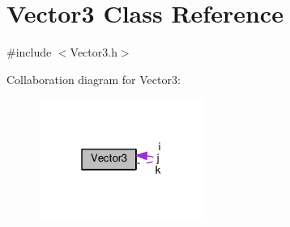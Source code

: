 \hypertarget{class_vector3}{\section{Vector3 Class Reference}
\label{class_vector3}
}


{\ttfamily \#include $<$Vector3.\+h$>$}



Collaboration diagram for Vector3\+:\nopagebreak
\begin{figure}[H]
\begin{center}
\leavevmode
\includegraphics[width=154pt]{class_vector3__coll__graph}
\end{center}
\end{figure}
